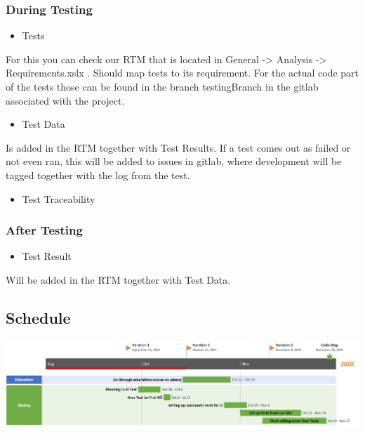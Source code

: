\subsubsection{During Testing}
\begin{itemize}
    \item Tests
\end{itemize}
For this you can check our RTM that is located in General -> Analysis -> Requirements.xslx . Should map tests to its requirement. For the actual code part of the tests those can be found in the branch testingBranch in the gitlab associated with the project. 
\begin{itemize}
    
    \item{Test Data}
\end{itemize}
Is added in the RTM together with Test Results. If a test comes out as failed or not even ran, this will be added to issues in gitlab, where development will be tagged together with the log from the test.
\begin{itemize}

    \item{Test Traceability}

\end{itemize}
\subsubsection{After Testing}
\begin{itemize}
    \item Test Result
  
\end{itemize}
Will be added in the RTM together with Test Data.
\subsection{Schedule}
\vfill
\includegraphics[width=\linewidth]{Pictures/TestSchedule.PNG}

    \vfill
    \clearpage
